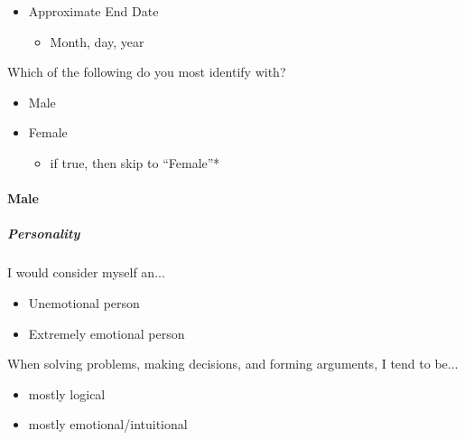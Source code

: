 \begin{multicols}{2}
 \begin{itemize}
  \item
        Approximate End Date

        \begin{itemize}
         \item
               Month, day, year
        \end{itemize}
 \end{itemize}

 Which of the following do you most identify with?

 \begin{itemize}
  \item
        Male
 \end{itemize}

 \begin{itemize}
  \item
        Female

        \begin{itemize}
         \item
               if true, then skip to ``Female''*
        \end{itemize}
 \end{itemize}

 \paragraph{Male}

 \subparagraph{Personality}

 I would consider myself an...

 \begin{itemize}
  \item
        Unemotional person
 \end{itemize}

 \begin{itemize}
  \item
        Extremely emotional person
 \end{itemize}

 When solving problems, making decisions, and forming arguments, I tend to be...

 \begin{itemize}
  \item
        mostly logical
 \end{itemize}

 \begin{itemize}
  \item
        mostly emotional/intuitional
 \end{itemize}


\end{multicols}
